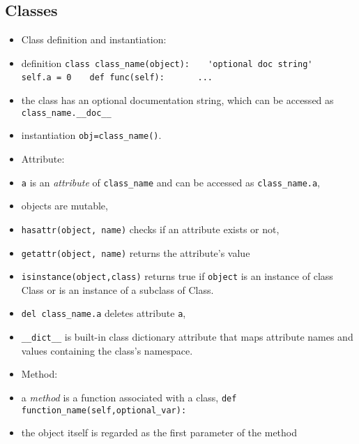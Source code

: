 \documentclass[onecolumn]{IEEEtran} %
\begin{document}
\subsection{Classes\label{class_section}}
\begin{itemize}
    \item Class definition and instantiation:
    \bi
        \item definition \newline \verb|class class_name(object):| \newline \verb|   'optional doc string'| \newline
            \verb|   self.a = 0| \newline
            \verb|   def func(self):| \newline
            \verb|      ...|
        \item the class has an optional documentation string, which can be accessed as \newline \verb|class_name.__doc__|
        \item instantiation \newline \verb|obj=class_name()|.
    \ei
    \item Attribute:
    \bi
        \item \verb|a| is an \emph{attribute} of \verb|class_name| and can be accessed as \verb|class_name.a|,
        \bi
            \item objects are mutable,
            \item \verb|hasattr(object, name)| checks if an attribute exists or not,
            \item \verb|getattr(object, name)| returns the attribute’s value
            \item \verb|isinstance(object,class)| returns true if \verb|object| is an instance of class Class or is an instance of a subclass of Class.
            \item \verb|del class_name.a| deletes attribute \verb|a|,
            \item \verb|__dict__| is built-in class dictionary attribute that maps attribute names and values containing the class's namespace.
        \ei
    \ei
    \item Method:
    \bi
        \item a \emph{method} is a function associated with a class, \newline
            \verb|def function_name(self,optional_var):|
        \item the object itself is regarded as the first parameter of the method

\end{itemize}
\end{document}
